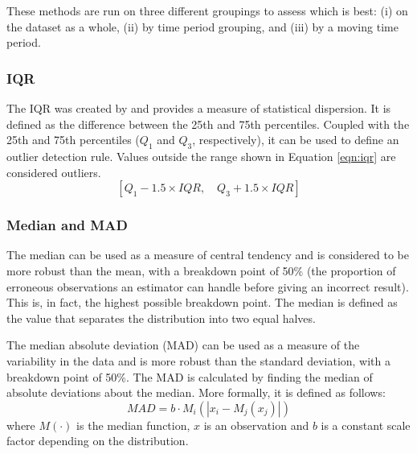 \documentclass[11pt,twosided,a4paper]{report}
\begin{document}
These methods are run on three different groupings to assess which is best: (i) on the dataset as a whole, (ii) by time period grouping, and (iii) by a moving time period.


\subsubsection{IQR} \label{iqr}

The IQR was created by \cite{tukey1977iqr} and provides a measure of statistical dispersion. It is defined as the difference between the 25th and 75th percentiles. Coupled with the 25th and 75th percentiles ($Q_1$ and $Q_3$, respectively), it can be used to define an outlier detection rule. Values outside the range shown in Equation \ref{eqn:iqr} are considered outliers.
\begin{equation} \label{eqn:iqr}
[ Q_1 - 1.5 \times IQR, \quad Q_3 + 1.5 \times IQR]
\end{equation}

\subsubsection{Median and MAD} \label{mad}

The median can be used as a measure of central tendency and is considered to be more robust than the mean, with a breakdown point of 50\% (the proportion of erroneous observations an estimator can handle before giving an incorrect result). This is, in fact, the highest possible breakdown point. The median is defined as the value that separates the distribution into two equal halves.

The median absolute deviation (MAD) can be used as a measure of the variability in the data and is more robust than the standard deviation, with a breakdown point of 50\%. The MAD is calculated by finding the median of absolute deviations about the median. More formally, it is defined as follows:
\begin{equation}
MAD = b \cdot M_i (| x_i - M_j (x_j) |)
\end{equation}
where $M(\cdot)$ is the median function, $x$ is an observation and $b$ is a constant scale factor depending on the distribution.

\end{document}
